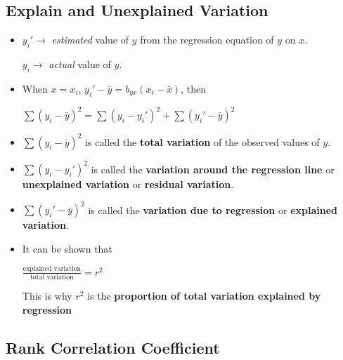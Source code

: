 \subsection*{Explain and Unexplained Variation}

\begin{itemize}
    \item $y_i' \rightarrow$ \textit{estimated} value of $y$ from the regression equation of $y$ on $x$.

        $y_i \rightarrow$ \textit{actual} value of $y$.

    \item When $x = x_i$, $y_i' - \bar{y} = b_{yx} (x_i - \bar{x})$, then

        $\sum (y_i - \bar{y})^2 = \sum (y_i - y_i')^2 + \sum (y_i' - \bar{y})^2$

    \item $\sum (y_i - \bar{y})^2$ is called the \textbf{total variation} of the observed values of  $y$.

    \item $\sum (y_i - y_i')^2$ is called the \textbf{variation around the regression line} or \textbf{unexplained variation} or \textbf{residual variation}.

    \item $\sum (y_i' - \bar{y})^2$ is called the \textbf{variation due to regression} or \textbf{explained variation}.

    \item It can be shown that

        $\frac{\text{explained variation}}{\text{total variation}} = r^2$

        This is why $r^2$ is the \textbf{proportion of total variation explained by regression}

\end{itemize}

\subsection*{Rank Correlation Coefficient}

